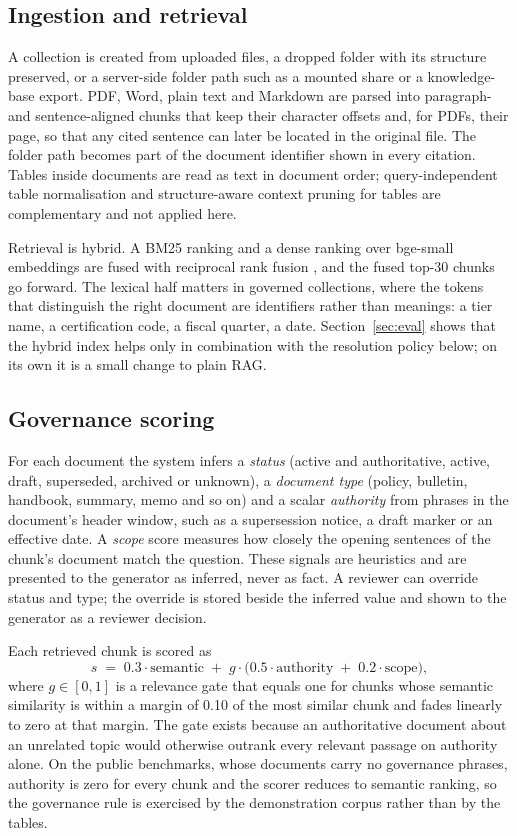 \documentclass[11pt]{article}
\begin{document}
\subsection{Ingestion and retrieval}
A collection is created from uploaded files, a dropped folder with its
structure preserved, or a server-side folder path such as a mounted share
or a knowledge-base export. PDF, Word, plain text and Markdown are parsed
into paragraph- and sentence-aligned chunks that keep their character
offsets and, for PDFs, their page, so that any cited sentence can later be
located in the original file. The folder path becomes part of the document
identifier shown in every citation. Tables inside documents are read as
text in document order; query-independent table normalisation
\citep{najpande-etal-2026-quiett} and structure-aware context pruning for
tables \citep{titiya-etal-2026-captr} are complementary and not applied
here.

Retrieval is hybrid. A BM25 ranking \citep{robertson2009bm25} and a dense
ranking over bge-small embeddings \citep{xiao2023bge} are fused with
reciprocal rank fusion \citep{cormack2009rrf}, and the fused top-30 chunks
go forward. The lexical half matters in governed collections, where the
tokens that distinguish the right document are identifiers rather than
meanings: a tier name, a certification code, a fiscal quarter, a date.
Section~\ref{sec:eval} shows that the hybrid index helps only in
combination with the resolution policy below; on its own it is a small
change to plain RAG.

\subsection{Governance scoring}
\label{sec:scoring}
For each document the system infers a \emph{status} (active and
authoritative, active, draft, superseded, archived or unknown), a
\emph{document type} (policy, bulletin, handbook, summary, memo and so on)
and a scalar \emph{authority} from phrases in the document's header window,
such as a supersession notice, a draft marker or an effective date. A
\emph{scope} score measures how closely the opening sentences of the chunk's
document match the question. These signals are heuristics and are
presented to the generator as inferred, never as fact. A reviewer can
override status and type; the override is stored beside the inferred value
and shown to the generator as a reviewer decision.

Each retrieved chunk is scored as
\[
s \;=\; 0.3\cdot\text{semantic} \;+\; g\cdot\big(0.5\cdot\text{authority}
\;+\; 0.2\cdot\text{scope}\big),
\]
where $g\in[0,1]$ is a relevance gate that equals one for chunks whose
semantic similarity is within a margin of 0.10 of the most similar chunk
and fades linearly to zero at that margin. The gate exists because an
authoritative document about an unrelated topic would otherwise outrank
every relevant passage on authority alone. On the public benchmarks, whose
documents carry no governance phrases, authority is zero for every chunk
and the scorer reduces to semantic ranking, so the governance rule is
exercised by the demonstration corpus rather than by the tables.
\end{document}
